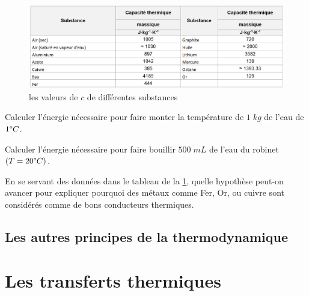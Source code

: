 \documentclass[11pt,a4paper]{article}
\begin{document}
\begin{figure}[h]
    \centering
    \includegraphics[width=\linewidth]{imgs/p4/tableC.png}
    \caption{les valeurs de $c$ de différentes substances }
    \label{fig:capacités}
\end{figure}
\vspace{.5cm}
\begin{exo}
Calculer l’énergie nécessaire pour faire monter la température de $1\;kg$ de l’eau de $1\degree C$.
\vspace{3cm}
\end{exo}

\begin{exo}
Calculer l’énergie nécessaire pour faire bouillir $500\; mL$ de l’eau du robinet $(T=20\degree C)$.  
\vspace{4cm}
\end{exo}

\begin{exo}
En se servant des données dans le tableau de la \ref{fig:capacités}, quelle hypothèse peut-on avancer pour expliquer pourquoi des métaux comme Fer, Or, ou cuivre sont considérés comme de bons conducteurs thermiques. 
\vspace{4cm}
\end{exo}

\subsection{Les autres principes de la thermodynamique}

\section{Les transferts thermiques}
\end{document}
